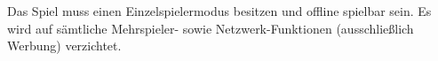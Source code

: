 Das Spiel \gls{muss} einen Einzelspielermodus besitzen und offline spielbar sein. Es wird auf sämtliche Mehrspieler- sowie Netzwerk-Funktionen (ausschließlich Werbung) verzichtet.